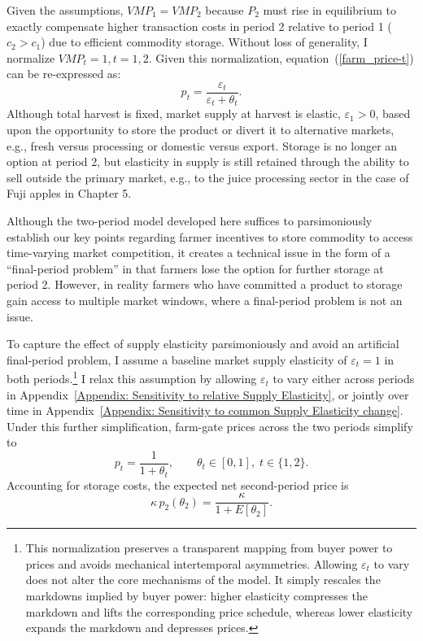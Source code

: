Given the assumptions, $VMP_1 = VMP_2$ because $P_2$ must rise in equilibrium to exactly compensate higher transaction costs in period 2 relative to period 1 ($c_2 > c_1$) due to efficient commodity storage. Without loss of generality, I normalize $VMP_t = 1, t = 1, 2$. Given this normalization, equation~(\ref{farm_price-t}) can be re-expressed as:
\begin{equation}
\label{simplified-price}
p_{t} = \frac{\varepsilon_t}{\varepsilon_t + \theta_t}.
\end{equation}
Although total harvest is fixed, market supply at harvest is elastic, $\varepsilon_1 > 0$, based upon the opportunity to store the product or divert it to alternative markets, e.g., fresh versus processing or domestic versus export. Storage is no longer an option at period 2, but elasticity in supply is still retained through the ability to sell outside the primary market, e.g., to the juice processing sector in the case of Fuji apples in Chapter 5.

Although the two-period model developed here suffices to parsimoniously establish our key points regarding farmer incentives to store commodity to access time-varying market competition, it creates a technical issue in the form of a ``final-period problem'' in that farmers lose the option for further storage at period 2. However, in reality farmers who have committed a product to storage gain access to multiple market windows, where a final-period problem is not an issue. 

To capture the effect of supply elasticity parsimoniously and avoid an artificial final-period problem, I assume a baseline market supply elasticity of $\varepsilon_t = 1$ in both periods.\footnote{This normalization preserves a transparent mapping from buyer power to prices and avoids mechanical intertemporal asymmetries. Allowing $\varepsilon_t$ to vary does not alter the core mechanisms of the model. It simply rescales the markdowns implied by buyer power: higher elasticity compresses the markdown and lifts the corresponding price schedule, whereas lower elasticity expands the markdown and depresses prices.}
I relax this assumption by allowing $\varepsilon_t$ to vary either across periods in Appendix~\ref{Appendix: Sensitivity to relative Supply Elasticity}, or jointly over time in Appendix~\ref{Appendix: Sensitivity to common Supply Elasticity change}. Under this further simplification, farm-gate prices across the two periods simplify to
\begin{equation}
p_{t} = \frac{1}{1+\theta_t}, \qquad \theta_t \in [0,1], \; t \in \{1,2\}.
\label{Eq: price formation by buyer power}
\end{equation}
Accounting for storage costs, the expected net second-period price is
\begin{equation}
    \kappa\, p_2(\theta_2)
= \frac{\kappa}{1+E[\theta_2]}.
\end{equation}

